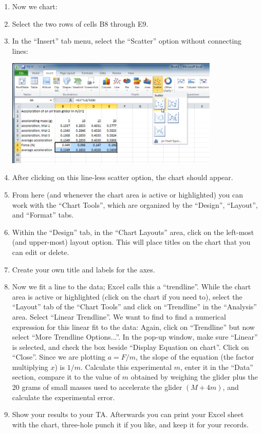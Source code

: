 \begin{enumerate}[label=\arabic*.]
\item Now we chart:
\squishlist
\item Select the two rows of cells B8 through E9.
\item In the ``Insert'' tab menu, select the ``Scatter'' option without connecting lines:
\squishend
\begin{center} \includegraphics*[width=0.8\textwidth]{imgs/6labs/6Alab/6Aexp3/6A_exp3_Excel_Spreadsheet4.png} \end{center}
\squishlist
\item After clicking on this line-less scatter option, the chart should appear.
\item From here (and whenever the chart area is active or highlighted) you can work with the ``Chart Tools'', which are organized by the ``Design'', ``Layout'', and ``Format'' tabs.
\item Within the ``Design'' tab, in the ``Chart Layouts'' area, click on the left-most (and upper-most) layout option.  This will place titles on the chart that you can edit or delete.
\item Create your own title and labels for the axes.
\squishend

\item Now we fit a line to the data; Excel calls this a ``trendline''.  While the chart area is active or highlighted (click on the chart if you need to), select the ``Layout'' tab of the ``Chart Tools'' and click on ``Trendline'' in the ``Analysis'' area.  Select ``Linear Trendline''.  We want to find to find a numerical expression for this linear fit to the data: Again, click on ``Trendline'' but now select ``More Trendline Options...''.  In the pop-up window, make sure ``Linear'' is selected, and check the box beside ``Display Equation on chart''.  Click on ``Close''.  Since we are plotting \(a = F/m\), the slope of the equation (the factor multiplying \(x\)) is \(1/m\).  Calculate this experimental \(m\), enter it in the ``Data'' section, compare it to the value of \(m\) obtained by weighing the glider plus the 20 grams of small masses used to accelerate the glider \((M+4m)\), and calculate the experimental error.

\item Show your results to your TA.  Afterwards you can print your Excel sheet with the chart, three-hole punch it if you like, and keep it for your records.

\end{enumerate}

